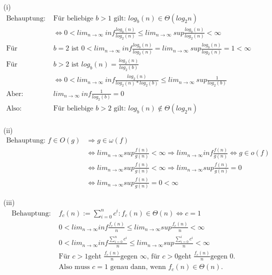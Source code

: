 \documentclass{article}
\begin{document}
\begin{enumerate}
\begin{enumerate}
\item[(i)]
	\begin{align*}
	\text{Behauptung: } &\text{Für beliebige } b > 1 \text{ gilt: } log_b(n) \in \Theta(log_2n) \\
	&\Leftrightarrow 0 < lim_{n \rightarrow \infty}~ inf \frac{log_b(n)}{log_2(n)} \le 
		lim_{n \rightarrow \infty}~ sup \frac{log_b(n)}{log_2(n)} < \infty \\
	\text{Für } &b=2 \text{ ist } 0 <  lim_{n \rightarrow \infty}~ inf \frac{log_b(n)}{log_2(n)} 
		= lim_{n \rightarrow \infty}~ sup \frac{log_b(n)}{log_2(n)} = 1 < \infty \\
	\text{Für } &b>2 \text{ ist } log_b(n) = \frac{log_2(n)}{log_2(b)} \\
	&\Leftrightarrow 0 < lim_{n \rightarrow \infty}~ inf \frac{log_2(n)}{log_2(n)*log_2(b)} 
		\le lim_{n \rightarrow \infty}~ sup \frac{1}{log_2(b)} \\
	\text{Aber: } &lim_{n \rightarrow \infty}~ inf \frac{1}{log_2(b)} = 0  \\
	\text{Also: } &\text{Für beliebige } b > 2 \text{ gilt: } log_b(n) \notin \Theta(log_2n) \\   
	\end{align*}

\item[(ii)]
	\begin{align*}
		\text{Behauptung: } f \in O(g) &\Rightarrow g \in \omega(f) \\
		&\Leftrightarrow lim_{n \rightarrow \infty} sup \frac{f(n)}{g(n)} 
			< \infty \Rightarrow lim_{n \rightarrow \infty} inf 
			\frac{f(n)}{g(n)} \Leftrightarrow g \in o(f) \\
		&\Leftrightarrow lim_{n \rightarrow \infty} sup \frac{f(n)}{g(n)} 
			< \infty \Rightarrow lim_{n \rightarrow \infty} sup
                        \frac{f(n)}{g(n)} = 0 \\
		&\Leftrightarrow lim_{n \rightarrow \infty} sup \frac{f(n)}{g(n)} = 0 
			< \infty 
	\end{align*}

\item[(iii)]
	\begin{align*}
	\text{Behauptung: } &f_c(n) := \sum_{i=0}^n c^i: f_c(n) \in \Theta(n) \Leftrightarrow c=1 \\
	&0 < lim_{n \rightarrow \infty} inf \frac{f_c(n)}{n} \le lim_{n \rightarrow \infty} sup \frac{f_c(n)}{n} < \infty \\
	&0 < lim_{n \rightarrow \infty} inf \frac{\sum_{i=0}^n c^i}{n} \le lim_{n \rightarrow \infty} sup \frac{\sum_{i=0}^i c^i}{n} < \infty \\
	&\text{Für } c > 1 \text{geht } \frac{f_c(n)}{n} \text{gegen } \infty \text{, für } c > 0 \text{geht }  \frac{f_c(n)}{n} \text{gegen 0.} \\
	&\text{Also muss } c = 1 \text{ genau dann, wenn } f_c(n) \in \Theta(n).
	\end{align*}
\end{enumerate}


\end{enumerate}
\end{document}
